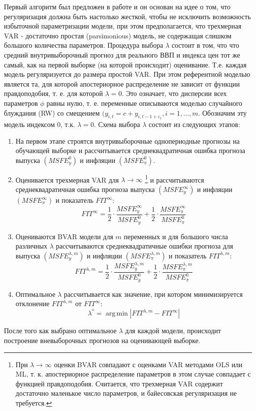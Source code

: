 \documentclass[11pt]{article} %
\DeclareMathOperator*{\argmin}{arg\,min}
\begin{document}
Первый алгоритм был предложен в работе \cite{banbura_al_2010_large} и он основан на идее о том, что регуляризация должна быть настолько жесткой, чтобы не исключить возможность избыточной параметризации модели, при этом предполагается, что трехмерная VAR - достаточно простая (parsimonious) модель, не содержащая слишком большого количества параметров. Процедура выбора $\lambda$ состоит в том, что что средний внутривыборочный прогноз для реального ВВП и индекса цен тот же самый, как на первой выборке (на которой происходит) оценивание. Т.е. каждая модель регуляризуется до размера простой VAR. При этом  референтной моделью является та, для которой апостериорное распределение не зависит от функции правдоподобия, т. е. для которой $\lambda=0$. Это означает, что дисперсии всех параметров $\phi$ равны нулю, т. е. переменные описываются моделью случайного блуждания (RW) со смещением $(y_{i,t}=c+y_{i,t-1 +\varepsilon_t}, i=1,\ldots,m$. Обозначим эту модель индексом 0,  т.к. $\lambda=0$.
Схема выбора $\lambda$ состоит из следующих этапов:
\begin{enumerate}
\item На первом этапе  строятся внутривыборочные однопериодные прогнозы на обучающей выборке и рассчитывается среднеквадратичная ошибка прогноза выпуска $(MSFE_y^{0})$ и инфляции $(MSFE_{\pi}^{0})$.
\item Оценивается трехмерная VAR для $\lambda\to \infty$ \footnote{При $\lambda\to \infty$ оценки BVAR совпадают с оценками VAR методами OLS или ML, т. к. апостериорное распределение параметров в этом случае совпадает с функцией правдоподобия. Считается, что трехмерная VAR содержит достаточно маленькое число параметров, и байесовская регуляризация не требуется.} и рассчитываются среднеквадратичная ошибка прогноза выпуска $(MSFE_y^{\infty})$ и инфляции $(MSFE_{\pi}^{\infty})$ и показатель $FIT^{\infty}$:
\begin{equation}
FIT^{\infty}=\frac{1}{2}\cdot\frac{MSFE_y^{\infty}}{MSFE^0_y} + \frac{1}{2}\cdot\frac{MSFE_{\pi}^{\infty}}{MSFE^0_{\pi}}
\end{equation}
\item Оцениваются BVAR модели для $m$ переменных и для большого числа различных $\lambda$ рассчитываются среднеквадратичные ошибки прогноза для выпуска $(MSFE_y^{\lambda,m})$ и инфляции $(MSFE_{\pi}^{\lambda,m})$ и показатель $FIT^{{\lambda,m}}$: 
\begin{equation}
FIT^{\lambda,m}=\frac{1}{2}\cdot\frac{MSFE_y^{\lambda,m}}{MSFE^0_y} + \frac{1}{2}\cdot\frac{MSFE_{\pi}^{\lambda,m}}{MSFE^0_{\pi}}
\end{equation}
\item Оптимальное $\lambda$ рассчитывается как значение, при котором минимизируется отклонение $FIT^{\lambda,m}$ от $FIT^{\infty}$:
\begin{equation}
\lambda^*=\argmin |FIT^{\lambda, m}-FIT^{\infty}| 
\end{equation}
\end{enumerate}
После того как выбрано оптимальное $\lambda$ для каждой модели, происходит построение вневыборочных прогнозов на оценивающей выборке.
\end{document}
